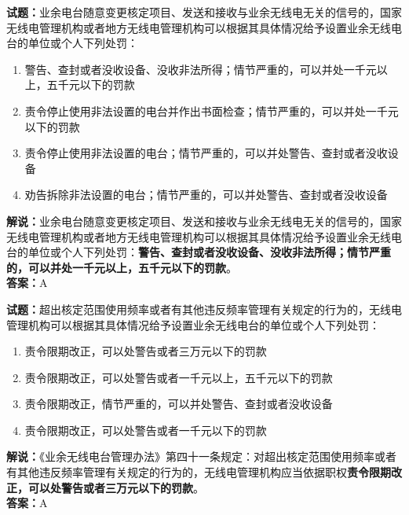 \documentclass{ctexbook}
\begin{document}

\bigskip


\noindent\textbf{试题：}业余电台随意变更核定项目、发送和接收与业余无线电无关的信号的，国家无线电管理机构或者地方无线电管理机构可以根据其具体情况给予设置业余无线电台的单位或个人下列处罚：
\begin{enumerate}[leftmargin=3em]
\item 警告、查封或者没收设备、没收非法所得；情节严重的，可以并处一千元以上，五千元以下的罚款
\item 责令停止使用非法设置的电台并作出书面检查；情节严重的，可以并处一千元以下的罚款
\item 责令停止使用非法设置的电台；情节严重的，可以并处警告、查封或者没收设备
\item 劝告拆除非法设置的电台；情节严重的，可以并处警告、查封或者没收设备
\end{enumerate}
\noindent\textbf{解说：}业余电台随意变更核定项目、发送和接收与业余无线电无关的信号的，国家无线电管理机构或者地方无线电管理机构可以根据其具体情况给予设置业余无线电台的单位或个人下列处罚：\textbf{警告、查封或者没收设备、没收非法所得；情节严重的，可以并处一千元以上，五千元以下的罚款}。\\\noindent\textbf{答案：}A


\bigskip


\noindent\textbf{试题：}超出核定范围使用频率或者有其他违反频率管理有关规定的行为的，无线电管理机构可以根据其具体情况给予设置业余无线电台的单位或个人下列处罚：
\begin{enumerate}[leftmargin=3em]
\item 责令限期改正，可以处警告或者三万元以下的罚款
\item 责令限期改正，可以处警告或者一千元以上，五千元以下的罚款
\item 责令限期改正，情节严重的，可以并处警告、查封或者没收设备
\item 责令限期改正，可以处警告或者一千元以下的罚款
\end{enumerate}
\noindent\textbf{解说：}《业余无线电台管理办法》第四十一条规定：对超出核定范围使用频率或者有其他违反频率管理有关规定的行为的，无线电管理机构应当依据职权\textbf{责令限期改正，可以处警告或者三万元以下的罚款}。\\\textbf{答案：}A



\bigskip
\end{document}
